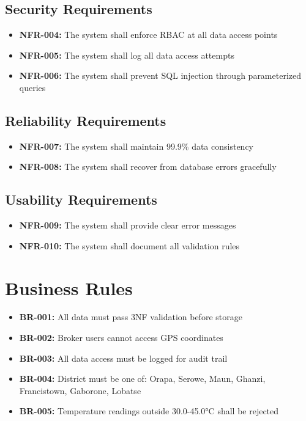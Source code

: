 \subsection{Security Requirements}

\begin{itemize}
    \item \textbf{NFR-004:} The system shall enforce RBAC at all data access points
    \item \textbf{NFR-005:} The system shall log all data access attempts
    \item \textbf{NFR-006:} The system shall prevent SQL injection through parameterized queries
\end{itemize}

\subsection{Reliability Requirements}

\begin{itemize}
    \item \textbf{NFR-007:} The system shall maintain 99.9\% data consistency
    \item \textbf{NFR-008:} The system shall recover from database errors gracefully
\end{itemize}

\subsection{Usability Requirements}

\begin{itemize}
    \item \textbf{NFR-009:} The system shall provide clear error messages
    \item \textbf{NFR-010:} The system shall document all validation rules
\end{itemize}

\section{Business Rules}

\begin{itemize}
    \item \textbf{BR-001:} All data must pass 3NF validation before storage
    \item \textbf{BR-002:} Broker users cannot access GPS coordinates
    \item \textbf{BR-003:} All data access must be logged for audit trail
    \item \textbf{BR-004:} District must be one of: Orapa, Serowe, Maun, Ghanzi, Francistown, Gaborone, Lobatse
    \item \textbf{BR-005:} Temperature readings outside 30.0-45.0°C shall be rejected
\end{itemize}

